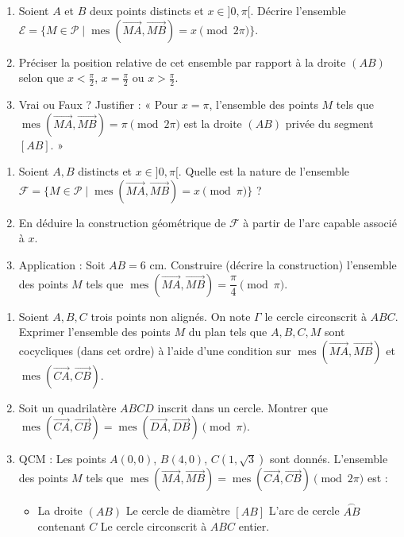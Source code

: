 \documentclass[11pt]{article}
\begin{document}
\newcommand{\mes}{\operatorname{mes}}%
\begin{exercice}[Arc capable : ensemble $\mes(\vec{MA}, \vec{MB}) = x + 2k\pi$]
\begin{enumerate}
    \item Soient $A$ et $B$ deux points distincts et $x \in ]0, \pi[$. Décrire l'ensemble $\mathcal{E} = \{ M \in \mathcal{P} \mid \mes(\vec{MA}, \vec{MB}) = x \pmod{2\pi} \}$.
    \item Préciser la position relative de cet ensemble par rapport à la droite $(AB)$ selon que $x < \frac{\pi}{2}$, $x = \frac{\pi}{2}$ ou $x > \frac{\pi}{2}$.
    \item Vrai ou Faux ? Justifier : « Pour $x = \pi$, l'ensemble des points $M$ tels que $\mes(\vec{MA}, \vec{MB}) = \pi \pmod{2\pi}$ est la droite $(AB)$ privée du segment $[AB]$. »
\end{enumerate}
\end{exercice}

\begin{exercice}[Arc capable : ensemble $\mes(\vec{MA}, \vec{MB}) = x + k\pi$]
\begin{enumerate}
    \item Soient $A, B$ distincts et $x \in ]0, \pi[$. Quelle est la nature de l'ensemble $\mathcal{F} = \{ M \in \mathcal{P} \mid \mes(\vec{MA}, \vec{MB}) = x \pmod{\pi} \}$ ?
    \item En déduire la construction géométrique de $\mathcal{F}$ à partir de l'arc capable associé à $x$.
    \item Application : Soit $AB = 6$ cm. Construire (décrire la construction) l'ensemble des points $M$ tels que $\mes(\vec{MA}, \vec{MB}) = \dfrac{\pi}{4} \pmod{\pi}$.
\end{enumerate}
\end{exercice}

\begin{exercice}
\begin{enumerate}
    \item Soient $A, B, C$ trois points non alignés. On note $\Gamma$ le cercle circonscrit à $ABC$. Exprimer l'ensemble des points $M$ du plan tels que $A, B, C, M$ sont cocycliques (dans cet ordre) à l'aide d'une condition sur $\mes(\vec{MA}, \vec{MB})$ et $\mes(\vec{CA}, \vec{CB})$.
    \item Soit un quadrilatère $ABCD$ inscrit dans un cercle. Montrer que $\mes(\vec{CA}, \vec{CB}) = \mes(\vec{DA}, \vec{DB}) \pmod{\pi}$.
    \item QCM : Les points $A(0,0)$, $B(4,0)$, $C(1, \sqrt{3})$ sont donnés. L'ensemble des points $M$ tels que $\mes(\vec{MA}, \vec{MB}) = \mes(\vec{CA}, \vec{CB}) \pmod{2\pi}$ est :
    \begin{itemize}
        \item[A)] La droite $(AB)$ \quad [B)] Le cercle de diamètre $[AB]$ \quad [C)] L'arc de cercle $\overset{\frown}{AB}$ contenant $C$ \quad [D)] Le cercle circonscrit à $ABC$ entier.
    \end{itemize}
\end{enumerate}
\end{exercice}
\end{document}
